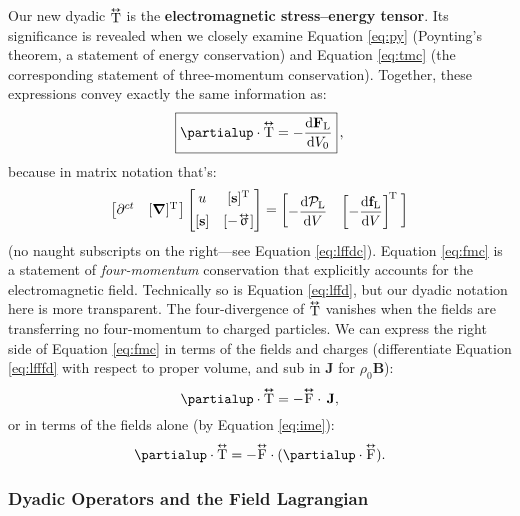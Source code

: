 \documentclass[12pt]{article}
\renewcommand{\vv}[1]{\mathbf{#1}}
\newcommand{\dd}[1]{\mathrm{d}#1}
\newcommand{\del}{\boldsymbol{\nabla}}
\newcommand{\tightoverset}[2]{%
  \mathop{#2}\limits^{\vbox to -.5ex{\kern-0.75ex\hbox{$#1$}\vss}}}
\newcommand{\inlinedy}[1]{\tightoverset{\text{\tiny$\bm\leftrightarrow$}}{#1}}
\newcommand{\capdy}[1]{ \overset{ \text{\tiny$\bm\leftrightarrow$} }{\vphantom{\text{\small{A}}}\smash{#1}} }
\begin{document}
Our new dyadic $\inlinedy{\mathrm{T}}$ is the \textbf{electromagnetic stress--energy tensor}. Its significance is revealed when we closely examine Equation \ref{eq:py} (Poynting's theorem, a statement of energy conservation) and Equation \ref{eq:tmc} (the corresponding statement of three-momentum conservation). Together, these expressions convey exactly the same information as:
\begin{equation}\label{eq:fmc}
\boxed{ \partialup \cdot \capdy{\mathrm{T}} = - \dfrac{\dd \vv F_{\mathrm{L}}}{\dd V_0} } \, ,
\end{equation}
because in matrix notation that's:
\begin{equation*}
\begin{bmatrix}
\partial^{ct} & [ \del ]^{\mathrm{T}} \mkern1mu
\end{bmatrix}
\begin{bmatrix}
u & [\vv s]^{\mathrm{T}} \\[1ex]
[\vv s] & [ - \mkern-2mu \inlinedy{\upsigma} \mkern1mu ]
\end{bmatrix}
=
\begin{bmatrix}
- \dfrac{\dd \mathcal{P}_{\textrm{L}}}{\dd V} & \left[ - \dfrac{\dd \vv f_{\mathrm{L}}}{\dd V} \right] ^{\mkern-2mu \mathrm{T} \; }
\end{bmatrix}
\end{equation*}
(no naught subscripts on the right---see Equation \ref{eq:lffdc}). Equation \ref{eq:fmc} is a statement of \emph{four-momentum} conservation that explicitly accounts for the electromagnetic field. Technically so is Equation \ref{eq:lffd}, but our dyadic notation here is more transparent. The four-divergence of $\inlinedy{\mathrm{T}}$ vanishes when the fields are transferring no four-momentum to charged particles. We can express the right side of Equation \ref{eq:fmc} in terms of the fields and charges (differentiate Equation \ref{eq:lfffd} with respect to proper volume, and sub in $\vv J$ for $\rho_0 \vv B$):
\begin{equation*}
\partialup \cdot \capdy{\mathrm{T}} = - \capdy{\mathrm{F}} \cdot \, \vv J ,
\end{equation*}
or in terms of the fields alone (by Equation \ref{eq:ime}):
\begin{equation*}
\partialup \cdot \capdy{\mathrm{T}} = - \capdy{\mathrm{F}} \cdot ( \partialup \cdot \capdy{\mathrm{F}} ).
\end{equation*}

\subsubsection{Dyadic Operators and the Field Lagrangian}
\end{document}
